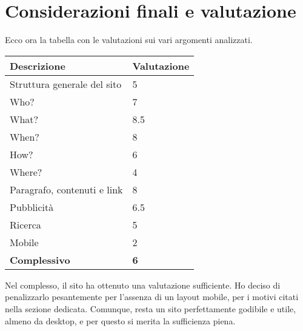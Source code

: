 \section{Considerazioni finali e valutazione}

Ecco ora la tabella con le valutazioni sui vari argomenti analizzati.
\bgroup

\setlength{\tabcolsep}{1em} %
{\renewcommand{\arraystretch}{1.8}%
\begin{center}
    \begin{tabularx}{\textwidth}{|X|X|}
        \hline
        \textbf{Descrizione} & \textbf{Valutazione} \\
        \hline \hline
        Struttura generale del sito & 5 \\
        \hline 
        Who? & 7 \\
        \hline 
        What? & 8.5 \\
        \hline 
        When? & 8 \\
        \hline 
        How? & 6 \\
        \hline
        Where? & 4 \\
        \hline 
        Paragrafo, contenuti e link & 8 \\
        \hline
        Pubblicità & 6.5 \\
        \hline 
        Ricerca & 5 \\
        \hline
        Mobile & 2 \\
        \hline \hline
        \textbf{Complessivo} & \textbf{6} \\
        \hline
    \end{tabularx}
\end{center}
\egroup

Nel complesso, il sito ha ottenuto una valutazione sufficiente. Ho deciso di penalizzarlo
pesantemente per l'assenza di un layout mobile, per i motivi citati nella sezione dedicata.
Comunque, resta un sito perfettamente godibile e utile, almeno da desktop, e per questo si merita
la sufficienza piena.